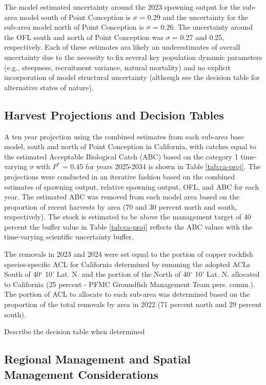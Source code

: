 \documentclass[11pt,
  english,
  letterpaper,
]{article}
\begin{document}
The model estimated uncertainty around the 2023 spawning output for the sub-area model south of Point Conception is \(\sigma\) = 0.29 and the uncertainty for the sub-area model north of Point Conception is \(\sigma\) = 0.26. The uncertainty around the OFL south and north of Point Conception was \(\sigma\) = 0.27 and 0.25, respectively. Each of these estimates ara likely an underestimates of overall uncertainty due to the necessity to fix several key population dynamic parameters (e.g., steepness, recruitment variance, natural mortality) and no explicit incorporation of model structural uncertainty (although see the decision table for alternative states of nature).

\hypertarget{harvest-projections-and-decision-tables}{%
\subsection{Harvest Projections and Decision Tables}\label{harvest-projections-and-decision-tables}}

A ten year projection using the combined estimates from each sub-area base model, south and north of Point Conception in California, with catches equal to the estimated Acceptable Biological Catch (ABC) based on the category 1 time-varying \(\sigma\) with \(P^*\) = 0.45 for years 2025-2034 is shown in Table \ref{tab:ca-proj}. The projections were conducted in an iterative fashion based on the combined estimates of spawning output, relative spawning output, OFL, and ABC for each year. The estimated ABC was removed from each model area based on the proportion of recent harvests by area (70 and 30 percent north and south, respectively). The stock is estimated to be above the management target of 40 percent the buffer value in Table \ref{tab:ca-proj} reflects the ABC values with the time-varying scientific uncertainty buffer.

The removals in 2023 and 2024 were set equal to the portion of copper rockfish species-specific ACL for California determined by summing the adopted ACLs South of 40\(^\circ\) 10' Lat. N. and the portion of the North of 40\(^\circ\) 10' Lat. N. allocated to California (25 percent - PFMC Groundfish Management Team pers. comm.). The portion of ACL to allocate to each sub-area was determined based on the proportion of the total removals by area in 2022 (71 percent north and 29 percent south).

Describe the decision table when determined

\hypertarget{regional-management-and-spatial-management-considerations}{%
\subsection{Regional Management and Spatial Management Considerations}\label{regional-management-and-spatial-management-considerations}}
\end{document}
